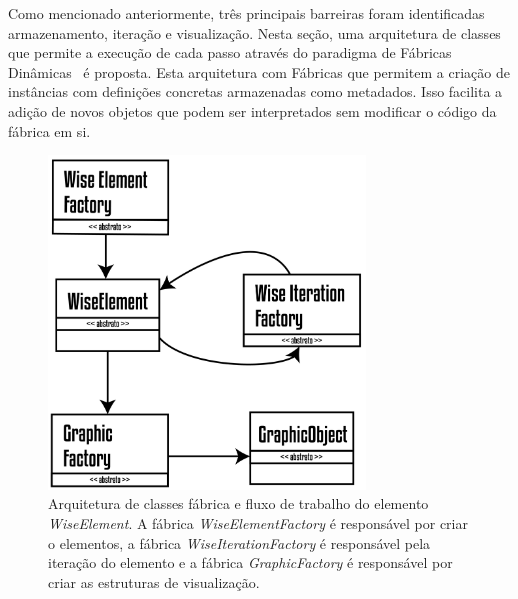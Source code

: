 Como mencionado anteriormente, três principais barreiras foram identificadas armazenamento, iteração e visualização. Nesta seção, uma arquitetura de classes que permite a execução de cada passo através do paradigma de Fábricas Dinâmicas~ \cite{factorypattern} é proposta. Esta arquitetura com Fábricas que permitem a criação de instâncias com definições concretas armazenadas como metadados. Isso facilita a adição de novos objetos que podem ser interpretados sem modificar o código da fábrica em si. 


\begin{figure}[!htbp]
	\centering
	\includegraphics[width=0.75\textwidth]{Figures/WiseElementWorkflow@16x.png}
	\caption{Arquitetura de classes fábrica e fluxo de trabalho do elemento \textit{WiseElement}. A fábrica \textit{WiseElementFactory} é responsável por criar o elementos, a fábrica \textit{WiseIterationFactory} é responsável pela iteração do elemento e a fábrica \textit{GraphicFactory} é responsável por criar as estruturas de visualização. }
	\label{fig2:wiselementsworkflow}
\end{figure}

